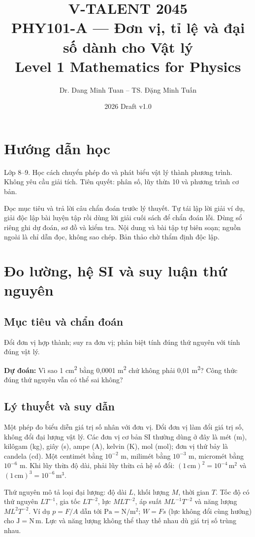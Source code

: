 \documentclass[11pt,a4paper,openany]{book}
\begin{document}
\title{V-TALENT 2045\\ PHY101-A --- Đơn vị, tỉ lệ và đại số dành cho Vật lý\\\large Level 1 \textbar{} Mathematics for Physics}
\author{Dr. Dang Minh Tuan -- TS. Đặng Minh Tuấn}
\date{2026 \textbar{} Draft v1.0}
\maketitle
\tableofcontents
\chapter*{Hướng dẫn học}
Lớp 8–9. Học cách chuyển phép đo và phát biểu vật lý thành phương trình. Không yêu cầu giải tích. Tiên quyết: phân số, lũy thừa 10 và phương trình cơ bản.

Đọc mục tiêu và trả lời câu chẩn đoán trước lý thuyết. Tự tái lập lời giải ví dụ, giải độc lập bài luyện tập rồi dùng lời giải cuối sách để chẩn đoán lỗi. Dùng sổ riêng ghi dự đoán, sơ đồ và kiểm tra. Nội dung và bài tập tự biên soạn; nguồn ngoài là chỉ dẫn đọc, không sao chép. Bản thảo chờ thẩm định độc lập.
\chapter{Đo lường, hệ SI và suy luận thứ nguyên}
\section{Mục tiêu và chẩn đoán}
Đổi đơn vị hợp thành; suy ra đơn vị; phân biệt tính đúng thứ nguyên với tính đúng vật lý.

\textbf{Dự đoán:} Vì sao 1 cm\textsuperscript{2} bằng 0,0001 m\textsuperscript{2} chứ không phải 0,01 m\textsuperscript{2}? Công thức đúng thứ nguyên vẫn có thể sai không?
\section{Lý thuyết và suy dẫn}
Một phép đo biểu diễn giá trị số nhân với đơn vị. Đổi đơn vị làm đổi giá trị số, không đổi đại lượng vật lý. Các đơn vị cơ bản SI thường dùng ở đây là mét (m), kilôgam (kg), giây (s), ampe (A), kelvin (K), mol (mol); đơn vị thứ bảy là candela (cd). Một centimét bằng $10^{-2}$ m, milimét bằng $10^{-3}$ m, micromét bằng $10^{-6}$ m. Khi lũy thừa độ dài, phải lũy thừa cả hệ số đổi: $(1\,\mathrm{cm})^2=10^{-4}\,\mathrm{m^2}$ và $(1\,\mathrm{cm})^3=10^{-6}\,\mathrm{m^3}$.

Thứ nguyên mô tả loại đại lượng: độ dài $L$, khối lượng $M$, thời gian $T$. Tốc độ có thứ nguyên $LT^{-1}$, gia tốc $LT^{-2}$, lực $MLT^{-2}$, áp suất $ML^{-1}T^{-2}$ và năng lượng $ML^2T^{-2}$. Ví dụ $p=F/A$ dẫn tới $\mathrm{Pa=N/m^2}$; $W=Fs$ (lực không đổi cùng hướng) cho $\mathrm{J=N\,m}$. Lực và năng lượng không thể thay thế nhau dù giá trị số trùng nhau.
\end{document}
